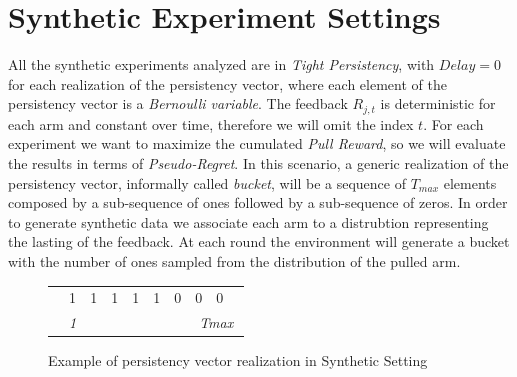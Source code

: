 \section{Synthetic Experiment Settings}
All the synthetic experiments analyzed are in \emph{Tight Persistency}, with $Delay=0$ for each realization of the persistency vector, where each element of the persistency vector is a \emph{Bernoulli variable}. The feedback $R_{j, t}$ is deterministic for each arm and constant over time, therefore we will omit the index $t$.  For each experiment we want to maximize the cumulated \emph{Pull Reward}, so we will evaluate the results in terms of \emph{Pseudo-Regret}. In this scenario, a generic realization of the persistency vector, informally called \emph{bucket}, will be a sequence of $T_{max}$ elements composed by a sub-sequence of ones followed by a sub-sequence of zeros. In order to generate synthetic data we associate each arm to a distrubtion representing the lasting of the feedback. At each round the environment will generate a bucket with the number of ones sampled from the distribution of the pulled arm. 
\begin{figure}[t]
	\centering
	\begin{tabular}{llllllllll}
		\cline{2-9}
		\multicolumn{1}{l|}{} & \multicolumn{1}{l|}{1} & \multicolumn{1}{l|}{1} & \multicolumn{1}{l|}{1} & \multicolumn{1}{l|}{1} & \multicolumn{1}{l|}{1} & \multicolumn{1}{l|}{0} & \multicolumn{1}{l|}{0} & \multicolumn{1}{l|}{0} &  \\ \cline{2-9}
		& \textit{1}             & \textit{}              &                        &                        &                        &                        & \multicolumn{3}{c}{\textit{ Tmax}}                 
	\end{tabular}
	\caption{Example of persistency vector realization in Synthetic Setting}
\end{figure}
